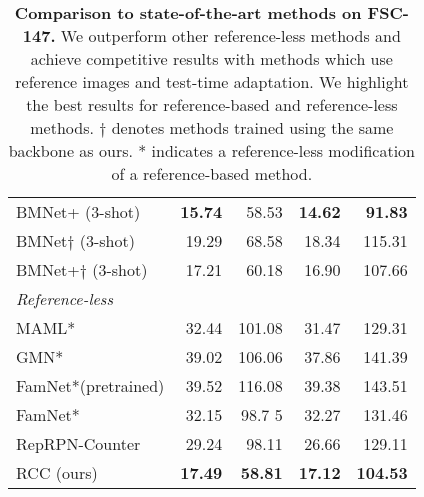 \documentclass[letterpaper, 11pt]{IEEEtran}
\begin{document}
\begin{table}
\begin{tabular}{lrrrr}
BMNet+  \cite{shi2022represent} \hfill (3-shot) 
& \textbf{15.74} & 58.53 & \textbf{14.62} & \textbf{91.83} \\
BMNet$\dag$ 
 \cite{shi2022represent} \hfill (3-shot) 
& 19.29  & 68.58 & 18.34  & 115.31  \\
BMNet+$\dag$  
 \cite{shi2022represent} \hfill (3-shot) 
& 17.21 & 60.18 & 16.90 & 107.66  \\
\midrule
\textit{Reference-less} & & & & \\
MAML* 
\cite{finn2017model}
& 32.44 & 101.08 & 31.47 & 129.31 \\
GMN* 
\cite{Lu18}
& 39.02 & 106.06& 37.86& 141.39 \\
 FamNet*(pretrained) 
 \cite{ranjan2021Famnet}
 & 39.52 & 116.08 & 39.38 & 143.51 \\
FamNet*
\cite{ranjan2021Famnet}
& 32.15 & 98.7 5& 32.27 & 131.46 \\
 RepRPN-Counter 
 \cite{ranjan2022exemplar}
 & 29.24 & 98.11 & 26.66 & 129.11 \\
RCC (ours) & \textbf{17.49}  & \textbf{58.81} & \textbf{17.12}  & \textbf{104.53} \\
\bottomrule
\end{tabular}
     \caption{\textbf{Comparison to state-of-the-art methods on FSC-147.} We outperform other reference-less methods and achieve competitive results with methods which use reference images and test-time adaptation. We highlight the best results for reference-based and reference-less methods. $\dag$ denotes methods trained using the same backbone as ours. 
    * indicates a reference-less modification of a reference-based method.
    }
    \label{FSC147_results_table}
\end{table}
\end{document}
